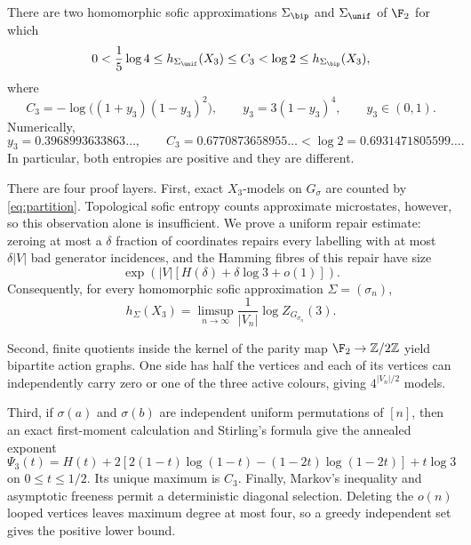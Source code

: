 \begin{theorem}\label{thm:main}
There are two homomorphic sofic approximations
$\Sigma_{\bip}$ and $\Sigma_{\unif}$ of $\F_2$ for which
\begin{equation}\label{eq:main-chain}
 0<\frac15\log4
 \le h_{\Sigma_{\unif}}(X_3)
 \le C_3
 <\log2
 \le h_{\Sigma_{\bip}}(X_3),
\end{equation}
where
\begin{equation}\label{eq:C3}
 C_3=-\log\bigl((1+y_3)(1-y_3)^2\bigr),
 \qquad y_3=3(1-y_3)^4,\qquad y_3\in(0,1).
\end{equation}
Numerically,
\[
 y_3=0.3968993633863\ldots,
 \qquad C_3=0.6770873658955\ldots
 <\log2=0.6931471805599\ldots.
\]
In particular, both entropies are positive and they are different.
\end{theorem}

There are four proof layers.  First, exact $X_3$-models on $G_\sigma$ are
counted by \eqref{eq:partition}.  Topological sofic entropy counts approximate
microstates, however, so this observation alone is insufficient.  We prove a
uniform repair estimate: zeroing at most a $\delta$ fraction of coordinates
repairs every labelling with at most $\delta|V|$ bad generator incidences, and
the Hamming fibres of this repair have size
\[
 \exp\!\left(|V|[H(\delta)+\delta\log3+o(1)]\right).
\]
Consequently, for every homomorphic sofic approximation $\Sigma=(\sigma_n)$,
\begin{equation}\label{eq:model-formula-intro}
 h_\Sigma(X_3)
 =\limsup_{n\to\infty}\frac{1}{|V_n|}
  \log Z_{G_{\sigma_n}}(3).
\end{equation}

Second, finite quotients inside the kernel of the parity map
$\F_2\to\mathbb Z/2\mathbb Z$ yield bipartite action graphs.  One side has
half the vertices and each of its vertices can independently carry zero or
one of the three active colours, giving $4^{|V_n|/2}$ models.

Third, if $\sigma(a)$ and $\sigma(b)$ are independent uniform permutations of
$[n]$, then an exact first-moment calculation and Stirling's formula give the
annealed exponent
\begin{equation}\label{eq:Psi-intro}
 \Psi_3(t)=H(t)+2\left[
 2(1-t)\log(1-t)-(1-2t)\log(1-2t)\right]+t\log3
\end{equation}
on $0\le t\le1/2$.  Its unique maximum is $C_3$.  Finally, Markov's inequality
and asymptotic freeness permit a deterministic diagonal selection.  Deleting
the $o(n)$ looped vertices leaves maximum degree at most four, so a greedy
independent set gives the positive lower bound.


